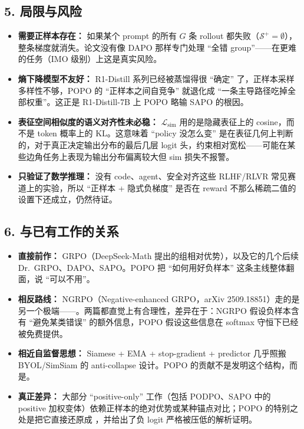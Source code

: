 \subsection{5. 局限与风险}

\begin{itemize}[leftmargin=1.5em]
  \item \textbf{需要正样本存在：} 如果某个 prompt 的所有 $G$ 条 rollout 都失败（$\mathcal{S}^{+}=\emptyset$），整条梯度就消失。论文没有像 DAPO 那样专门处理 ``全错 group''——在更难的任务（IMO 级别）上这是真实风险。
  \item \textbf{熵下降模型不友好：} R1-Distill 系列已经被蒸馏得很 ``确定'' 了，正样本采样多样性不够，POPO 的 ``正样本之间自竞争'' 就退化成 ``一条主导路径吃掉全部权重''。这正是 R1-Distill-7B 上 POPO 略输 SAPO 的根因。
  \item \textbf{表征空间相似度的语义对齐性未必稳：} $\mathcal{L}_{\text{sim}}$ 用的是隐藏表征上的 cosine，而不是 token 概率上的 KL。这意味着 ``policy 没怎么变'' 是在表征几何上判断的，对于真正决定输出分布的最后几层 logit 头，约束相对宽松——可能在某些边角任务上表现为输出分布偏离较大但 sim 损失不报警。
  \item \textbf{只验证了数学推理：} 没有 code、agent、安全对齐这些 RLHF/RLVR 常见赛道上的实验，所以 ``正样本 + 隐式负梯度'' 是否在 reward 不那么稀疏二值的设置下还成立，仍然待证。
\end{itemize}

\subsection{6. 与已有工作的关系}

\begin{itemize}[leftmargin=1.5em]
  \item \textbf{直接前作：} GRPO（DeepSeek-Math 提出的组相对优势），以及它的几个后续 Dr.~GRPO、DAPO、SAPO。POPO 把 ``如何用好负样本'' 这条主线整体翻面，说 ``可以不用''。
  \item \textbf{相反路线：} NGRPO（Negative-enhanced GRPO，arXiv 2509.18851）走的是另一个极端——。两篇都直觉上有合理性，差异在于：NGRPO 假设负样本含有 ``避免某类错误'' 的额外信息，POPO 假设这些信息在 softmax 守恒下已经被免费提供。
  \item \textbf{相近自监督思想：} Siamese + EMA + stop-gradient + predictor 几乎照搬 BYOL/SimSiam 的 anti-collapse 设计。POPO 的贡献不是发明这个结构，而是。
  \item \textbf{真正差异：} 大部分 ``positive-only'' 工作（包括 PODPO、SAPO 中的 positive 加权变体）依赖正样本的绝对优势或某种锚点对比；POPO 的特别之处是把它直接还原成 ，并给出了负 logit 严格被压低的解析证明。
\end{itemize}

